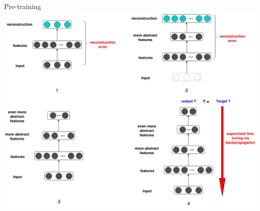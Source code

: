 % 	
	\begin{frame}[t]{Pre-training}
	 \includegraphics[width=0.9\linewidth]{layerwisewhole.png}
	\end{frame}


